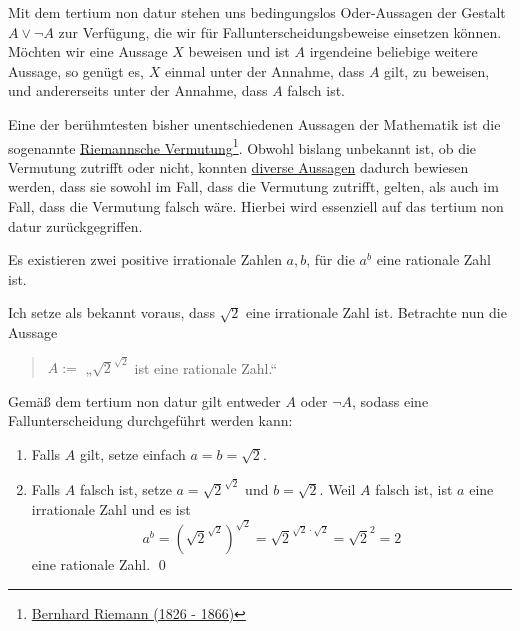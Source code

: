 \begin{bem}
    Mit dem tertium non datur stehen uns bedingungslos Oder-Aussagen der Gestalt $A\lor \neg A$ zur Verfügung, die wir für Fallunterscheidungsbeweise einsetzen können. Möchten wir eine Aussage $X$ beweisen und ist $A$ irgendeine beliebige weitere Aussage, so genügt es, $X$ einmal unter der Annahme, dass $A$ gilt, zu beweisen, und andererseits unter der Annahme, dass $A$ falsch ist.
    
    Eine der berühmtesten bisher unentschiedenen Aussagen der Mathematik ist die sogenannte \href{https://de.wikipedia.org/wiki/Riemannsche_Vermutung}{Riemannsche Vermutung}\footnote{\href{https://de.wikipedia.org/wiki/Bernhard_Riemann}{Bernhard Riemann (1826 - 1866)}}. Obwohl bislang unbekannt ist, ob die Vermutung zutrifft oder nicht, konnten \href{https://en.wikipedia.org/wiki/Riemann_hypothesis#Excluded_middle}{diverse Aussagen} dadurch bewiesen werden, dass sie sowohl im Fall, dass die Vermutung zutrifft, gelten, als auch im Fall, dass die Vermutung falsch wäre. Hierbei wird essenziell auf das tertium non datur zurückgegriffen.
\end{bem}


\begin{bsp}
    Es existieren zwei positive irrationale Zahlen $a,b$, für die $a^b$ eine rationale Zahl ist.
\end{bsp}


\begin{bew}
    Ich setze als bekannt voraus, dass $\sqrt{2}$ eine irrationale Zahl ist. Betrachte nun die Aussage
    \begin{quote}
        $A:=$ „$\sqrt{2}^{\sqrt{2}}$ ist eine rationale Zahl.“
    \end{quote}
    Gemäß dem tertium non datur gilt entweder $A$ oder $\neg A$, sodass eine Fallunterscheidung durchgeführt werden kann:
    \begin{enumerate}[1)]
        \item Falls $A$ gilt, setze einfach $a=b=\sqrt{2}$.
        \item Falls $A$ falsch ist, setze $a=\sqrt{2}^{\sqrt{2}}$ und $b=\sqrt{2}$. Weil $A$ falsch ist, ist $a$ eine irrationale Zahl und es ist
            \[ a^b = (\sqrt{2}^{\sqrt{2}})^{\sqrt{2}} = \sqrt{2}^{\sqrt{2}\cdot\sqrt{2}} = \sqrt{2}^2 = 2 \]
        eine rationale Zahl. \qed
    \end{enumerate}
\end{bew}

